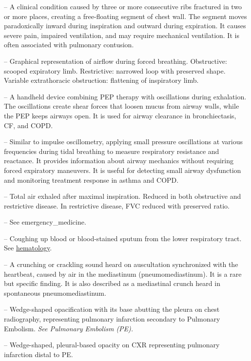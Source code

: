 -- A clinical condition caused by three or more consecutive ribs fractured in two or more places, creating a free-floating segment of chest wall. The segment moves paradoxically inward during inspiration and outward during expiration. It causes severe pain, impaired ventilation, and may require mechanical ventilation. It is often associated with pulmonary contusion.

-- Graphical representation of airflow during forced breathing. Obstructive: scooped expiratory limb. Restrictive: narrowed loop with preserved shape. Variable extrathoracic obstruction: flattening of inspiratory limb.

-- A handheld device combining PEP therapy with oscillations during exhalation. The oscillations create shear forces that loosen mucus from airway walls, while the PEP keeps airways open. It is used for airway clearance in bronchiectasis, CF, and COPD.

-- Similar to impulse oscillometry, applying small pressure oscillations at various frequencies during tidal breathing to measure respiratory resistance and reactance. It provides information about airway mechanics without requiring forced expiratory maneuvers. It is useful for detecting small airway dysfunction and monitoring treatment response in asthma and COPD.

-- Total air exhaled after maximal inspiration. Reduced in both obstructive and restrictive disease. In restrictive disease, FVC reduced with preserved ratio.

-- See emergency\_medicine.

-- Coughing up blood or blood-stained sputum from the lower respiratory tract. See \hyperlink{hematology}{hematology}.

-- A crunching or crackling sound heard on auscultation synchronized with the heartbeat, caused by air in the mediastinum (pneumomediastinum). It is a rare but specific finding. It is also described as a mediastinal crunch heard in spontaneous pneumomediastinum.

-- Wedge-shaped opacification with its base abutting the pleura on chest radiography, representing pulmonary infarction secondary to Pulmonary Embolism. \textit{See Pulmonary Embolism (PE).}

-- Wedge-shaped, pleural-based opacity on CXR representing pulmonary infarction distal to PE.

